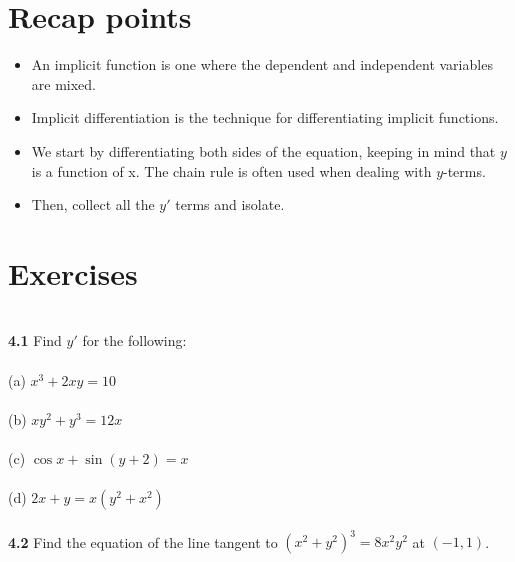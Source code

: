 \documentclass[11pt]{scrartcl}
\begin{document}
\section{Recap points}
\begin{itemize}
    \item An implicit function is one where the dependent and independent variables are mixed. 
    \item Implicit differentiation is the technique for differentiating implicit functions. 
    \item We start by differentiating both sides of the equation, keeping in mind that $y$ is a function of x. The chain rule is often used when dealing with $y$-terms. 
    \item Then, collect all the $y'$ terms and isolate. 
\end{itemize}
\section{Exercises}\\
\noindent
\textbf{4.1} Find $y'$ for the following:\\
\noindent\\
(a) $x^3+2xy=10$\\
\noindent\\
(b) $xy^2+y^3=12x$\\
\noindent\\
(c) $\cos x+\sin (y+2)=x$\\
\noindent\\
(d) $2x+y=x(y^2+x^2)$\\
\noindent\\
\textbf{4.2} Find the equation of the line tangent to $(x^2+y^2)^3=8x^2y^2$ at $(-1,1)$.
\end{document}
